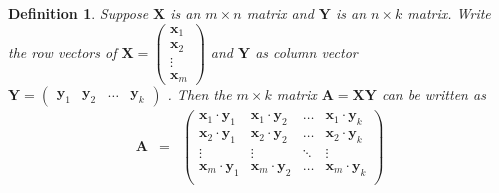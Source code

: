 \documentclass{beamer}
\newtheorem{defn}{Definition}
\numberwithin{equation}{section}
\begin{document}
\begin{frame}

\begin{defn} Suppose $\boldsymbol{X}$ is an $m \times n$ matrix and $\boldsymbol{Y}$ is an $n \times k$ matrix. Write the \alert{row} vectors of $\boldsymbol{X} = \begin{pmatrix} \boldsymbol{x}_{1} \\ \boldsymbol{x}_{2} \\ \vdots\\ \boldsymbol{x}_{m} \end{pmatrix} $ and $\boldsymbol{Y}$ as column vector $\boldsymbol{Y} = \begin{pmatrix} \boldsymbol{y}_{1} & \boldsymbol{y}_{2} & \hdots & \boldsymbol{y}_{k} \end{pmatrix}$ .  Then the $m \times k$ matrix $\boldsymbol{A} = \boldsymbol{X} \boldsymbol{Y}$ can be written as 
\begin{eqnarray}
\boldsymbol{A} & = & \begin{pmatrix} 
								\boldsymbol{x}_{1} \cdot \boldsymbol{y}_{1} & \boldsymbol{x}_{1} \cdot  \boldsymbol{y}_{2} & \hdots & \boldsymbol{x}_{1} \cdot  \boldsymbol{y}_{k}\\
								\boldsymbol{x}_{2} \cdot  \boldsymbol{y}_{1} & \boldsymbol{x}_{2} \cdot  \boldsymbol{y}_{2} & \hdots & \boldsymbol{x}_{2}\cdot  \boldsymbol{y}_{k}\\
								\vdots & \vdots & \ddots & \vdots \\
								\boldsymbol{x}_{m} \cdot  \boldsymbol{y}_{1} & \boldsymbol{x}_{m} \cdot \boldsymbol{y}_{2} & \hdots & \boldsymbol{x}_{m} \cdot  \boldsymbol{y}_{k}\\
								\end{pmatrix}  \nonumber 
\end{eqnarray}								


\end{defn}


\end{frame}
\end{document}
